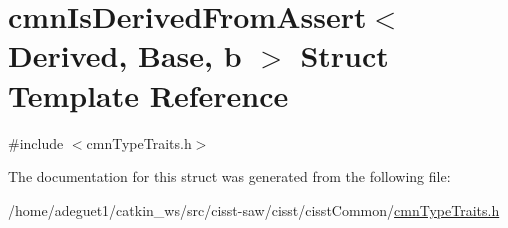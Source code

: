 \hypertarget{structcmn_is_derived_from_assert}{\section{cmn\-Is\-Derived\-From\-Assert$<$ Derived, Base, b $>$ Struct Template Reference}
\label{structcmn_is_derived_from_assert}
}


{\ttfamily \#include $<$cmn\-Type\-Traits.\-h$>$}



The documentation for this struct was generated from the following file\-:\begin{DoxyCompactItemize}
\item 
/home/adeguet1/catkin\-\_\-ws/src/cisst-\/saw/cisst/cisst\-Common/\hyperlink{cmn_type_traits_8h}{cmn\-Type\-Traits.\-h}\end{DoxyCompactItemize}

